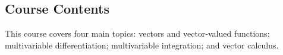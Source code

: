 \vfill\mbox{}
\pagebreak 

\iffalse
\subsection*{Prerequisite skills}
The prerequisite for this course is Math 134 (Calculus II) or Math 124 (Calculus II For Management, Life, and Social Sciences). Each of those courses has Calculus I as a prerequisite. Thus, it is expected that you are comfortable with material from those courses and that you can do the following:
\begin{itemize}
    \item Compute the derivative of a function using various rules of differentiation.
    \item 
\end{itemize}
\fi

\subsection*{Course Contents}
This course covers four main topics: vectors and vector-valued functions; multivariable differentiation; multivariable integration; and vector calculus.

